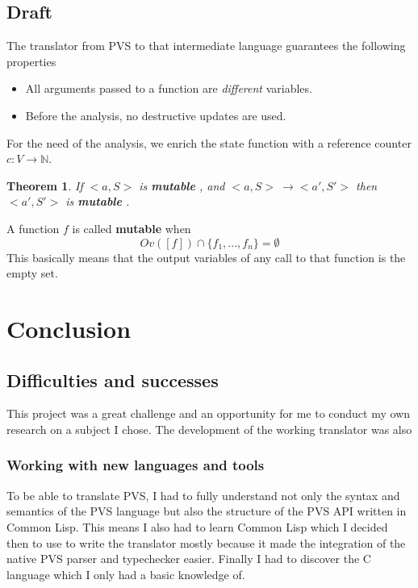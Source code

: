 \documentclass[12pt,a4paper]{article}
\newtheorem{theorem}{Theorem}
\newcommand{\N}{\mathbb{N}}
\newcommand{\mut}{  \textbf{ mutable } }
\newcommand{\bang}{ \textbf{ mutable } }
\begin{document}
\newpage
\subsection{Draft}

The translator from PVS to that intermediate language guarantees the following properties 
\begin{itemize}
\item All arguments passed to a function are \emph{different} variables.
\item Before the analysis, no destructive updates are used.
\end{itemize} 

For the need of the analysis, we enrich the state function with a reference counter $c:V \rightarrow \N$.


\begin{theorem}
If $<a, S>$ is \mut, and $<a, S> \ \longrightarrow <a', S'>$ then $<a', S'>$ is \mut.
\end{theorem}


A function $f$ is called \bang when
$$ Ov([f]) \cap \{ f_1, ... , f_n \} = \emptyset $$
This basically means that the output variables of any call to that function is the empty set.









\newpage
\section{Conclusion}


\subsection{Difficulties and successes}

This project was a great challenge and an opportunity for me to conduct my own research on a subject I chose. The development of the working translator was also 


\subsubsection{Working with new languages and tools}

To be able to translate PVS, I had to fully understand not only the syntax and semantics of the PVS language but also the structure of the PVS API written in Common Lisp. This means I also had to learn Common Lisp which I decided then to use to write the translator mostly because it made the integration of the native PVS parser and typechecker easier. Finally I had to discover the C language which I only had a basic knowledge of.
\end{document}

